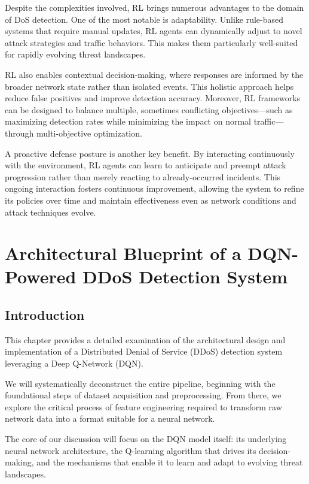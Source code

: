 \documentclass{report}
\begin{document}
Despite the complexities involved, RL brings numerous advantages to the domain of DoS detection. One of the most notable is adaptability. Unlike rule-based systems that require manual updates, RL agents can dynamically adjust to novel attack strategies and traffic behaviors. This makes them particularly well-suited for rapidly evolving threat landscapes.

RL also enables contextual decision-making, where responses are informed by the broader network state rather than isolated events. This holistic approach helps reduce false positives and improve detection accuracy. Moreover, RL frameworks can be designed to balance multiple, sometimes conflicting objectives—such as maximizing detection rates while minimizing the impact on normal traffic—through multi-objective optimization.

A proactive defense posture is another key benefit. By interacting continuously with the environment, RL agents can learn to anticipate and preempt attack progression rather than merely reacting to already-occurred incidents. This ongoing interaction fosters continuous improvement, allowing the system to refine its policies over time and maintain effectiveness even as network conditions and attack techniques evolve.

\chapter{Architectural Blueprint of a DQN-Powered DDoS Detection System}
\section{Introduction}

This chapter provides a detailed examination of the architectural design and implementation of a Distributed Denial of Service (DDoS) detection system leveraging a Deep Q-Network (DQN).

We will systematically deconstruct the entire pipeline, beginning with the foundational steps of dataset acquisition and preprocessing. From there, we explore the critical process of feature engineering required to transform raw network data into a format suitable for a neural network.

The core of our discussion will focus on the DQN model itself: its underlying neural network architecture, the Q-learning algorithm that drives its decision-making, and the mechanisms that enable it to learn and adapt to evolving threat landscapes.
\end{document}
